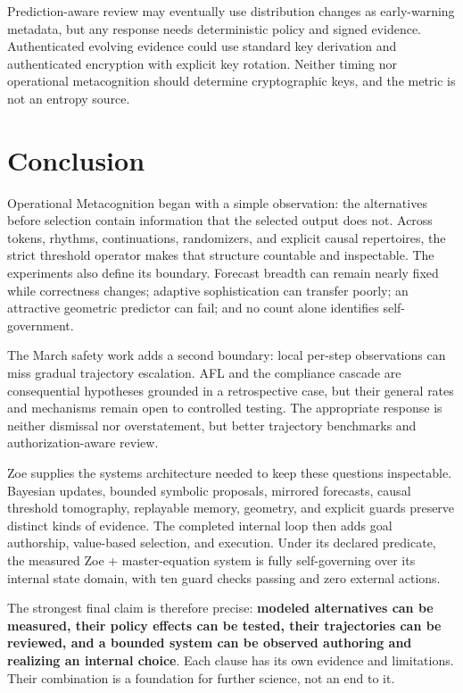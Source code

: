 Prediction-aware review may eventually use distribution changes as early-warning metadata, but any response needs deterministic policy and signed evidence. Authenticated evolving evidence could use standard key derivation and authenticated encryption with explicit key rotation. Neither timing nor operational metacognition should determine cryptographic keys, and the metric is not an entropy source.

\section{Conclusion}
Operational Metacognition began with a simple observation: the alternatives before selection contain information that the selected output does not. Across tokens, rhythms, continuations, randomizers, and explicit causal repertoires, the strict threshold operator makes that structure countable and inspectable. The experiments also define its boundary. Forecast breadth can remain nearly fixed while correctness changes; adaptive sophistication can transfer poorly; an attractive geometric predictor can fail; and no count alone identifies self-government.

The March safety work adds a second boundary: local per-step observations can miss gradual trajectory escalation. AFL and the compliance cascade are consequential hypotheses grounded in a retrospective case, but their general rates and mechanisms remain open to controlled testing. The appropriate response is neither dismissal nor overstatement, but better trajectory benchmarks and authorization-aware review.

Zoe supplies the systems architecture needed to keep these questions inspectable. Bayesian updates, bounded symbolic proposals, mirrored forecasts, causal threshold tomography, replayable memory, geometry, and explicit guards preserve distinct kinds of evidence. The completed internal loop then adds goal authorship, value-based selection, and execution. Under its declared predicate, the measured Zoe + master-equation system is fully self-governing over its internal state domain, with ten guard checks passing and zero external actions.

The strongest final claim is therefore precise: \textbf{modeled alternatives can be measured, their policy effects can be tested, their trajectories can be reviewed, and a bounded system can be observed authoring and realizing an internal choice}. Each clause has its own evidence and limitations. Their combination is a foundation for further science, not an end to it.
